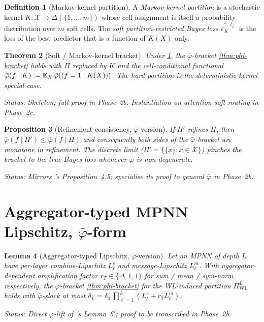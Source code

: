 \documentclass[10pt]{article}
\newtheorem{theorem}{Theorem}
\newtheorem{proposition}[theorem]{Proposition}
\newtheorem{lemma}[theorem]{Lemma}
\theoremstyle{definition}
\newtheorem{definition}[theorem]{Definition}
\theoremstyle{remark}
\newcommand{\eps}{\varepsilon}
\newcommand{\epsKL}[1]{\eps^{*,#1}_{K}}
\let\Pr\relax
\DeclareMathOperator{\Pr}{\mathbb{P}}
\newcommand{\E}{\mathbb{E}}
\newcommand{\bphi}{\bar{\varphi}}        %
\newcommand{\status}[1]{\par\noindent\emph{Status:} #1}
\begin{document}
\begin{definition}[Markov-kernel partition]\label{def:markov}
A \emph{Markov-kernel partition} is a stochastic kernel
$K:\mathcal{X}\to\Delta(\{1,\dots,m\})$ whose cell-assignment
is itself a probability distribution over $m$ soft cells. The
\emph{soft partition-restricted Bayes loss} $\epsKL{\ell_{\bphi}}$
is the loss of the best predictor that is a function of $K(X)$
only.
\end{definition}

\begin{theorem}[Soft / Markov-kernel bracket]\label{thm:soft}
Under \cref{def:markov}, the $\bphi$-bracket
\cref{thm:phi-bracket} holds with $\Pi$ replaced by $K$ and the
cell-conditional functional
$\bphi(f\mid K):=\E_{X}\,\bphi(\Pr(f=1\mid K(X)))$. The hard
partition is the deterministic-kernel special case.
\status{Skeleton; full proof in Phase~2b. Instantiation on
attention soft-routing in Phase~2c.}
\end{theorem}

\begin{proposition}[Refinement consistency, $\bphi$-version]
\label{prop:refine-phi}
If $\Pi'$ refines $\Pi$, then $\bphi(f\mid\Pi')\le\bphi(f\mid\Pi)$
and consequently both sides of the $\bphi$-bracket are
monotone in refinement. The discrete limit
($\Pi'=\{\{x\}:x\in\mathcal{X}\}$) pinches the bracket to the
true Bayes loss whenever $\bphi$ is non-degenerate.
\status{Mirrors 's Proposition~4.5;
specialise its proof to general $\bphi$ in Phase~2b.}
\end{proposition}

\section{Aggregator-typed MPNN Lipschitz, $\bphi$-form}
\label{sec:mpnn}

\begin{lemma}[Aggregator-typed Lipschitz, $\bphi$-version]
\label{lem:mpnn-typed}
Let an MPNN of depth $L$ have per-layer combine-Lipschitz $L_\ell^c$
and message-Lipschitz $L_\ell^m$. With aggregator-dependent
amplification factor $r_T\in\{\Delta,1,1\}$ for
sum / mean / sym-norm respectively, the $\bphi$-bracket
\cref{thm:phi-bracket} for the WL-induced partition $\Pi_{\mathrm{WL}}^L$
holds with $\bphi$-slack at most
$\delta_L=\delta_0\,\prod_{\ell=1}^L(L_\ell^c+r_T L_\ell^m)$.
\status{Direct $\bphi$-lift of 's
Lemma~6$'$; proof to be transcribed in Phase~2b.}
\end{lemma}
\end{document}
